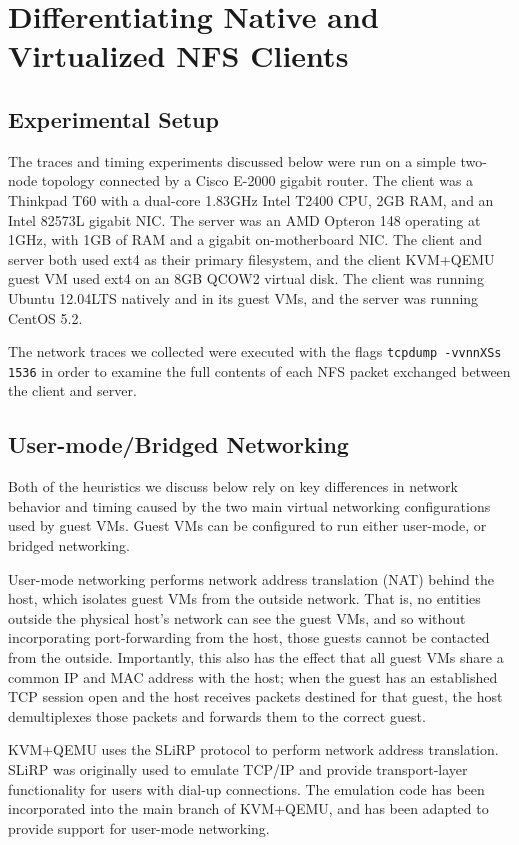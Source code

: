 \documentclass[letterpaper,twocolumn,11pt]{article}
\begin{document}
\section{Differentiating Native and Virtualized NFS Clients}
\label{sec:NFS}

\subsection{Experimental Setup}
\label{subsec:expSetup}
The traces and timing experiments discussed below were run on a simple two-node topology connected by a Cisco E-2000 gigabit router. The client was a Thinkpad T60 with a dual-core 1.83GHz Intel T2400 CPU, 2GB RAM, and an Intel 82573L gigabit NIC. The server was an AMD Opteron 148 operating at 1GHz, with 1GB of RAM and a gigabit on-motherboard NIC. The client and server both used ext4 as their primary filesystem, and the client KVM+QEMU guest VM used ext4 on an 8GB QCOW2 virtual disk. The client was running Ubuntu 12.04LTS natively and in its guest VMs, and the server was running CentOS 5.2.

The network traces we collected were executed with the flags \texttt{tcpdump -vvnnXSs 1536} in order to examine the full contents of each NFS packet exchanged between the client and server.

\subsection{User-mode/Bridged Networking}
\label{subsec:networkIntro}
Both of the heuristics we discuss below rely on key differences in network behavior and timing caused by the two main virtual networking configurations used by guest VMs. Guest VMs can be configured to run either user-mode, or bridged networking.

User-mode networking performs network address translation (NAT) behind the host, which isolates guest VMs from the outside network. That is, no entities outside the physical host's network can see the guest VMs, and so without incorporating port-forwarding from the host, those guests cannot be contacted from the outside. Importantly, this also has the effect that all guest VMs share a common IP and MAC address with the host; when the guest has an established TCP session open and the host receives packets destined for that guest, the host demultiplexes those packets and forwards them to the correct guest. 

KVM+QEMU uses the SLiRP protocol \cite{slirp} to perform network address translation. SLiRP was originally used to emulate TCP/IP and provide transport-layer functionality for users with dial-up connections. The emulation code has been incorporated into the main branch of KVM+QEMU, and has been adapted to provide support for user-mode networking.
\end{document}
